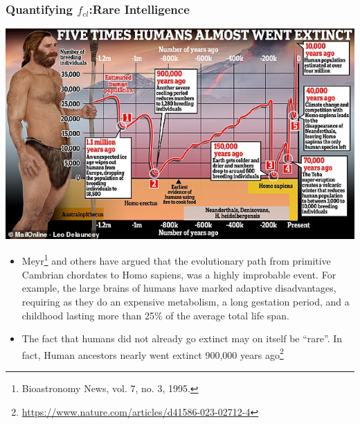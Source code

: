 \begin{frame}
\frametitle{Quantifying $f_{cl}$:Rare Intelligence}



\includegraphics[scale=0.35]{extinct}
\begin{itemize}
\item Meyr\footnote{Bioastronomy News, vol. 7, no. 3, 1995.} and others have argued that the evolutionary path from primitive Cambrian chordates to Homo sapiens, was a highly improbable event. For example, the large brains of humans have marked adaptive disadvantages, requiring as they do an expensive metabolism, a long gestation period, and a childhood lasting more than 25\% of the average total life span.
\item The fact that humans did not already go extinct may on itself be ``rare''. In fact, Human ancestors nearly went extinct 900,000 years ago\footnote{\url{
https://www.nature.com/articles/d41586-023-02712-4}}

\end{itemize}
\end{frame}

